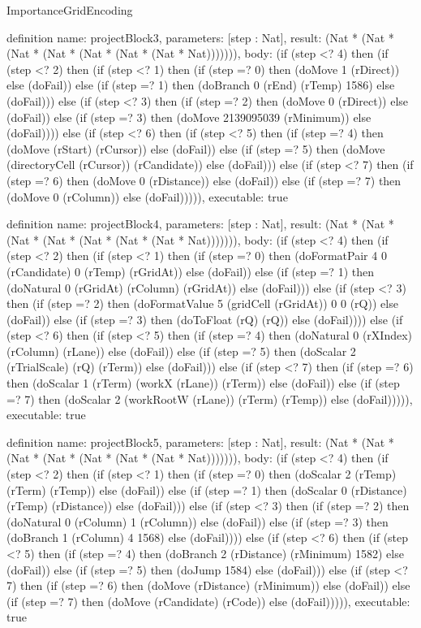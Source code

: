 \begin{lexlean}{ImportanceGridEncoding}
\begin{semanticmodule}
definition{
  name: projectBlock3,
  parameters: [step : Nat],
  result: (Nat * (Nat * (Nat * (Nat * (Nat * (Nat * (Nat * Nat))))))),
  body: (if (step <? 4) then
      (if (step <? 2) then
      (if (step <? 1) then
      (if (step =? 0) then (doMove 1 (rDirect)) else (doFail)) else
      (if (step =? 1) then (doBranch 0 (rEnd) (rTemp) 1586) else (doFail))) else
      (if (step <? 3) then
      (if (step =? 2) then (doMove 0 (rDirect)) else (doFail)) else
      (if (step =? 3) then (doMove 2139095039 (rMinimum)) else (doFail)))) else
      (if (step <? 6) then
      (if (step <? 5) then
      (if (step =? 4) then (doMove (rStart) (rCursor)) else (doFail)) else
      (if (step =? 5) then (doMove (directoryCell (rCursor)) (rCandidate)) else (doFail))) else
      (if (step <? 7) then
      (if (step =? 6) then (doMove 0 (rDistance)) else (doFail)) else
      (if (step =? 7) then (doMove 0 (rColumn)) else (doFail))))),
  executable: true
}

definition{
  name: projectBlock4,
  parameters: [step : Nat],
  result: (Nat * (Nat * (Nat * (Nat * (Nat * (Nat * (Nat * Nat))))))),
  body: (if (step <? 4) then
      (if (step <? 2) then
      (if (step <? 1) then
      (if (step =? 0) then (doFormatPair 4 0 (rCandidate) 0 (rTemp) (rGridAt)) else (doFail)) else
      (if (step =? 1) then (doNatural 0 (rGridAt) (rColumn) (rGridAt)) else (doFail))) else
      (if (step <? 3) then
      (if (step =? 2) then (doFormatValue 5 (gridCell (rGridAt)) 0 0 (rQ)) else (doFail)) else
      (if (step =? 3) then (doToFloat (rQ) (rQ)) else (doFail)))) else
      (if (step <? 6) then
      (if (step <? 5) then
      (if (step =? 4) then (doNatural 0 (rXIndex) (rColumn) (rLane)) else (doFail)) else
      (if (step =? 5) then (doScalar 2 (rTrialScale) (rQ) (rTerm)) else (doFail))) else
      (if (step <? 7) then
      (if (step =? 6) then (doScalar 1 (rTerm) (workX (rLane)) (rTerm)) else (doFail)) else
      (if (step =? 7) then (doScalar 2 (workRootW (rLane)) (rTerm) (rTemp)) else (doFail))))),
  executable: true
}

definition{
  name: projectBlock5,
  parameters: [step : Nat],
  result: (Nat * (Nat * (Nat * (Nat * (Nat * (Nat * (Nat * Nat))))))),
  body: (if (step <? 4) then
      (if (step <? 2) then
      (if (step <? 1) then
      (if (step =? 0) then (doScalar 2 (rTemp) (rTerm) (rTemp)) else (doFail)) else
      (if (step =? 1) then (doScalar 0 (rDistance) (rTemp) (rDistance)) else (doFail))) else
      (if (step <? 3) then
      (if (step =? 2) then (doNatural 0 (rColumn) 1 (rColumn)) else (doFail)) else
      (if (step =? 3) then (doBranch 1 (rColumn) 4 1568) else (doFail)))) else
      (if (step <? 6) then
      (if (step <? 5) then
      (if (step =? 4) then (doBranch 2 (rDistance) (rMinimum) 1582) else (doFail)) else
      (if (step =? 5) then (doJump 1584) else (doFail))) else
      (if (step <? 7) then
      (if (step =? 6) then (doMove (rDistance) (rMinimum)) else (doFail)) else
      (if (step =? 7) then (doMove (rCandidate) (rCode)) else (doFail))))),
  executable: true
}


\end{semanticmodule}
\end{lexlean}
